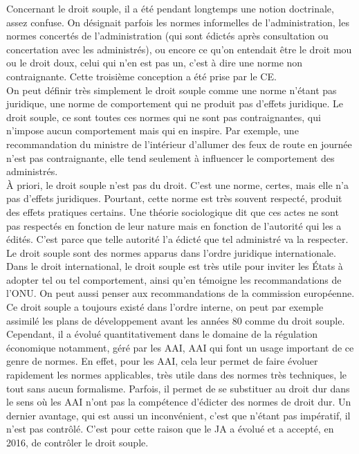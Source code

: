 \documentclass[10pt, a4paper, openany]{book}
\begin{document}
Concernant le droit souple, il a été pendant longtemps une notion doctrinale, assez confuse. On désignait parfois les normes informelles de l'administration, les normes concertés de l'administration (qui sont édictés après consultation ou concertation avec les administrés), ou encore ce qu'on entendait être le droit mou ou le droit doux, celui qui n'en est pas un, c'est à dire une norme non contraignante. Cette troisième conception a été prise par le CE. \\
On peut définir très simplement le droit souple comme une norme n'étant pas juridique, une norme de comportement qui ne produit pas d'effets juridique. Le droit souple, ce sont toutes ces normes qui ne sont pas contraignantes, qui n'impose aucun comportement mais qui en inspire. Par exemple, une recommandation du ministre de l'intérieur d'allumer des feux de route en journée n'est pas contraignante, elle tend seulement à influencer le comportement des administrés. \\
À priori, le droit souple n'est pas du droit. C'est une norme, certes, mais elle n'a pas d'effets juridiques. Pourtant, cette norme est très souvent respecté, produit des effets pratiques certains. Une théorie sociologique dit que ces actes ne sont pas respectés en fonction de leur nature mais en fonction de l'autorité qui les a édités. C'est parce que telle autorité l'a édicté que tel administré va la respecter. \\
Le droit souple sont des normes apparus dans l'ordre juridique internationale. Dans le droit international, le droit souple est très utile pour inviter les États à adopter tel ou tel comportement, ainsi qu'en témoigne les recommandations de l'ONU. On peut aussi penser aux recommandations de la commission européenne. \\
Ce droit souple a toujours existé dans l'ordre interne, on peut par exemple assimilé les plans de développement avant les années 80 comme du droit souple. Cependant, il a évolué quantitativement dans le domaine de la régulation économique notamment, géré par les AAI, AAI qui font un usage important de ce genre de normes. En effet, pour les AAI, cela leur permet de faire évoluer rapidement les normes applicables, très utile dans des normes très techniques, le tout sans aucun formalisme. Parfois, il permet de se substituer au droit dur dans le sens où les AAI n'ont pas la compétence d'édicter des normes de droit dur. Un dernier avantage, qui est aussi un inconvénient, c'est que n'étant pas impératif, il n'est pas contrôlé.  C'est pour cette raison que le JA a évolué et a accepté, en 2016, de contrôler le droit souple.
\end{document}
